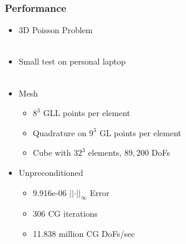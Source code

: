\documentclass{beamer}
\begin{document}
\begin{frame}
\begin{center}
\frametitle{Performance}

\begin{itemize}

\item $3$D Poisson Problem\\

~\\

\item Small test on personal laptop\\

~\\

\item Mesh

\begin{itemize}

\item $8^3$ GLL points per element

\item Quadrature on $9^3$ GL points per element

\item Cube with $32^3$ elements, $89,200$ DoFs

\end{itemize}

\end{itemize}

{\small

\setlength\columnsep{1pt}

\begin{multicols}{2}

\begin{itemize}

\setlength{\leftmarginii}{1em}

\item Unpreconditioned

\begin{itemize}

\item 9.916e-06 \hfill $\lvert \lvert \cdot \rvert \rvert_\infty$ Error \hspace{1em}

\item $306$ \hfill CG iterations \hspace{1em}

\item 11.838 million \hfill CG DoFs/sec \hspace{1em}


\end{itemize}
\end{itemize}
\end{multicols}}
\end{center}
\end{frame}
\end{document}

